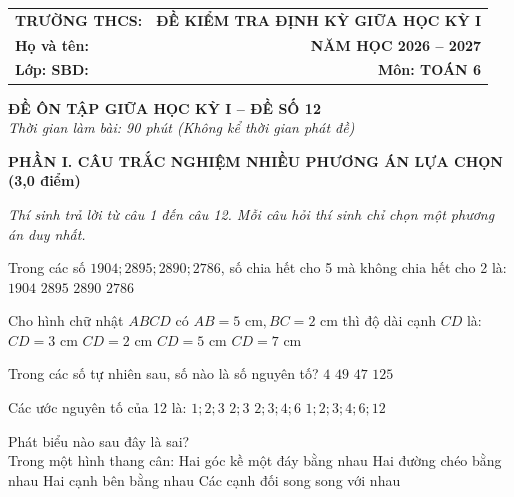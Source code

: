 \documentclass[12pt,a4paper]{article}
\begin{document}
\noindent
\begin{tabularx}{\linewidth}{X r}
\textbf{TRƯỜNG THCS: \dotfill} & \textbf{ĐỀ KIỂM TRA ĐỊNH KỲ GIỮA HỌC KỲ I} \\
\textbf{Họ và tên: \dotfill} & \textbf{NĂM HỌC 2026 -- 2027} \\
\textbf{Lớp: \dotfill \quad SBD: \dotfill} & \textbf{Môn: TOÁN 6} \\
\hline
\end{tabularx}
\vspace{2mm}

\begin{center}
  \textbf{\large ĐỀ ÔN TẬP GIỮA HỌC KỲ I -- ĐỀ SỐ 12}\\
  \textit{Thời gian làm bài: 90 phút (Không kể thời gian phát đề)}
\end{center}
\vspace{1mm}

\noindent\textbf{\large PHẦN I. CÂU TRẮC NGHIỆM NHIỀU PHƯƠNG ÁN LỰA CHỌN (3,0 điểm)}

\textit{Thí sinh trả lời từ câu 1 đến câu 12. Mỗi câu hỏi thí sinh chỉ chọn một phương án duy nhất.}

\vspace{1mm}
\begin{ex}
Trong các số $1904; 2895; 2890; 2786$, số chia hết cho 5 mà không chia hết cho 2 là:
\choice
{$1904$}
{\True $2895$}
{$2890$}
{$2786$}
\end{ex}

\begin{ex}
Cho hình chữ nhật $ABCD$ có $AB = 5\text{ cm}, BC = 2\text{ cm}$ thì độ dài cạnh $CD$ là:
\choice
{$CD = 3\text{ cm}$}
{$CD = 2\text{ cm}$}
{\True $CD = 5\text{ cm}$}
{$CD = 7\text{ cm}$}
\end{ex}

\begin{ex}
Trong các số tự nhiên sau, số nào là số nguyên tố?
\choice
{$4$}
{$49$}
{\True $47$}
{$125$}
\end{ex}

\begin{ex}
Các ước nguyên tố của 12 là:
\choice
{$1; 2; 3$}
{\True $2; 3$}
{$2; 3; 4; 6$}
{$1; 2; 3; 4; 6; 12$}
\end{ex}

\begin{ex}
Phát biểu nào sau đây là sai?\\Trong một hình thang cân:
\choice
{Hai góc kề một đáy bằng nhau}
{Hai đường chéo bằng nhau}
{Hai cạnh bên bằng nhau}
{\True Các cạnh đối song song với nhau}
\end{ex}
\end{document}
